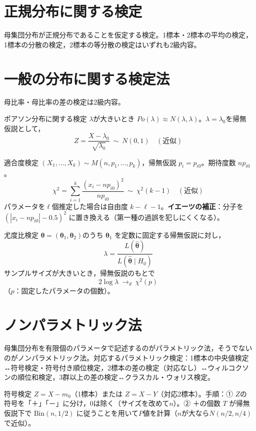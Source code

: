 \documentclass[a4paper,11pt]{ltjsarticle}
\begin{document}
\section{正規分布に関する検定}

母集団分布が正規分布であることを仮定する検定。1標本・2標本の平均の検定，1標本の分散の検定，2標本の等分散の検定はいずれも2級内容。

\section{一般の分布に関する検定法}

母比率・母比率の差の検定は2級内容。

\begin{term}{ポアソン分布に関する検定}
$\lambda$が大きいとき $Po(\lambda)\approx N(\lambda,\lambda)$。$\lambda=\lambda_0$を帰無仮説として，
\[
Z = \frac{X-\lambda_0}{\sqrt{\lambda_0}} \ \sim\ N(0,1) \quad(\text{近似})
\]
\end{term}

\begin{term}{適合度検定}
$(X_1,\dots,X_k)\sim M(n,p_1,\dots,p_k)$，帰無仮説 $p_i=p_{i0}$。期待度数 $np_{i0}$。
\[
\chi^2 = \sum_{i=1}^k \frac{(x_i-np_{i0})^2}{np_{i0}} \ \sim\ \chi^2(k-1) \quad(\text{近似})
\]
パラメータを$\ell$個推定した場合は自由度 $k-\ell-1$。\textbf{イエーツの補正}：分子を $(|x_i-np_{i0}|-0.5)^2$ に置き換える（第一種の過誤を犯しにくくなる）。
\end{term}

\begin{term}{尤度比検定}
$\bm\theta=(\bm\theta_1,\bm\theta_2)$のうち $\bm\theta_1$ を定数に固定する帰無仮説に対し，
\[
\lambda = \frac{L(\hat{\bm\theta})}{L(\hat{\bm\theta}\mid H_0)}
\]
サンプルサイズが大きいとき，帰無仮説のもとで
\[
2\log\lambda \ \to_d\ \chi^2(p)
\]
（$p$：固定したパラメータの個数）。
\end{term}

\section{ノンパラメトリック法}

母集団分布を有限個のパラメータで記述するのがパラメトリック法，そうでないのがノンパラメトリック法。対応するパラメトリック検定：1標本の中央値検定↔符号検定・符号付き順位検定，2標本の差の検定（対応なし）↔ウィルコクソンの順位和検定，3群以上の差の検定↔クラスカル・ウォリス検定。

\begin{term}{符号検定}
$Z=X-m_0$（1標本）または $Z=X-Y$（対応2標本）。手順：① $Z$の符号を「＋」「－」に分け，0は除く（サイズを改めて$n$）。② ＋の個数 $T$ が帰無仮説下で $\mathrm{Bin}(n,1/2)$ に従うことを用いて$P$値を計算（$n$が大なら$N(n/2,n/4)$で近似）。
\end{term}
\end{document}

